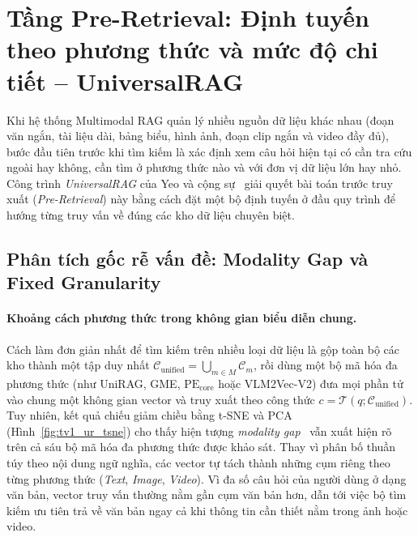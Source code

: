 
\section{Tầng Pre-Retrieval: Định tuyến theo phương thức và mức độ chi tiết -- UniversalRAG}
\label{sec:method_universalrag}

Khi hệ thống Multimodal RAG quản lý nhiều nguồn dữ liệu khác nhau (đoạn văn ngắn, tài liệu dài, bảng biểu, hình ảnh, đoạn clip ngắn và video đầy đủ), bước đầu tiên trước khi tìm kiếm là xác định xem câu hỏi hiện tại có cần tra cứu ngoài hay không, cần tìm ở phương thức nào và với đơn vị dữ liệu lớn hay nhỏ. Công trình \textit{UniversalRAG} của Yeo và cộng sự~\cite{yeo2026universalrag} giải quyết bài toán trước truy xuất (\textit{Pre-Retrieval}) này bằng cách đặt một bộ định tuyến ở đầu quy trình để hướng từng truy vấn về đúng các kho dữ liệu chuyên biệt.

\subsection{Phân tích gốc rễ vấn đề: Modality Gap và Fixed Granularity}
\label{subsec:ur_problem}

\paragraph{Khoảng cách phương thức trong không gian biểu diễn chung.}
Cách làm đơn giản nhất để tìm kiếm trên nhiều loại dữ liệu là gộp toàn bộ các kho thành một tập duy nhất $\mathcal{C}_{\mathrm{unified}} = \bigcup_{m \in M} \mathcal{C}_m$, rồi dùng một bộ mã hóa đa phương thức (như UniRAG, GME, $\mathrm{PE}_{\mathrm{core}}$ hoặc VLM2Vec-V2) đưa mọi phần tử vào chung một không gian vector và truy xuất theo công thức $c = \mathcal{T}(q; \mathcal{C}_{\mathrm{unified}})$. Tuy nhiên, kết quả chiếu giảm chiều bằng t-SNE và PCA~\cite{yeo2026universalrag} (Hình~\ref{fig:tv1_ur_tsne}) cho thấy hiện tượng \textit{modality gap}~\cite{liang2022mind} vẫn xuất hiện rõ trên cả sáu bộ mã hóa đa phương thức được khảo sát. Thay vì phân bố thuần túy theo nội dung ngữ nghĩa, các vector tự tách thành những cụm riêng theo từng phương thức (\textit{Text}, \textit{Image}, \textit{Video}). Vì đa số câu hỏi của người dùng ở dạng văn bản, vector truy vấn thường nằm gần cụm văn bản hơn, dẫn tới việc bộ tìm kiếm ưu tiên trả về văn bản ngay cả khi thông tin cần thiết nằm trong ảnh hoặc video.

